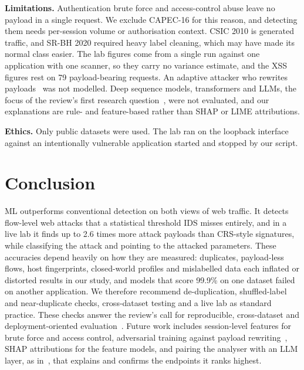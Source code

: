 \documentclass[conference]{IEEEtran}
\begin{document}
\textbf{Limitations.} Authentication brute force and access-control abuse leave no payload in a single
request. We exclude CAPEC-16 for this reason, and detecting them needs per-session volume or
authorisation context. CSIC 2010 is generated traffic, and SR-BH 2020 required heavy label cleaning,
which may have made its normal class easier. The lab figures come from a single run against one
application with one scanner, so they carry no variance estimate, and the XSS figures rest on 79
payload-bearing requests. An adaptive attacker who rewrites payloads~\cite{qu2024} was not modelled. Deep sequence models,
transformers and LLMs, the focus of the review's first research question~\cite{fasla2026}, were not
evaluated, and our explanations are rule- and feature-based rather than SHAP or LIME attributions.

\textbf{Ethics.} Only public datasets were used. The lab ran on the loopback interface against an
intentionally vulnerable application started and stopped by our script.

\section{Conclusion}
ML outperforms conventional detection on both views of web traffic. It detects flow-level web
attacks that a statistical threshold IDS misses entirely, and in a live lab it finds up to 2.6 times more
attack payloads than CRS-style signatures, while classifying the attack and pointing to the attacked
parameters. These accuracies depend heavily on how they are measured: duplicates, payload-less
flows, host fingerprints, closed-world profiles and mislabelled data each inflated or distorted results
in our study, and models that score 99.9\% on one dataset failed on another application. We therefore
recommend de-duplication, shuffled-label and near-duplicate checks, cross-dataset testing and a live lab
as standard practice. These checks answer the review's call for reproducible, cross-dataset and
deployment-oriented evaluation~\cite{fasla2026}. Future work includes session-level features for brute force and access control, adversarial
training against payload rewriting~\cite{floris2025}, SHAP attributions for the feature models, and
pairing the analyser with an LLM layer, as in~\cite{wang2024,khairmode2026}, that explains and confirms
the endpoints it ranks highest.
\end{document}
